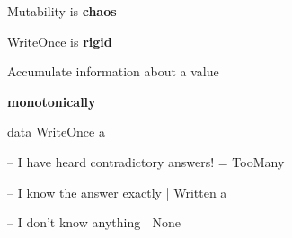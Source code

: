\documentclass[UKenglish,usenames,dvipsnames,svgnames,table,aspectratio=169,mathserif]{beamer}
\newcommand{\nl}{\vspace{\baselineskip}}
\newcommand{\pnl}{\pause \nl}
\begin{document}
\begin{frame}

\centering \LARGE

Mutability is {\bf chaos}

\nl
WriteOnce is {\bf rigid}
\end{frame}


\begin{frame}[fragile]

\LARGE
\begin{center}
Accumulate information about a value

\pnl

{\bf monotonically}
\end{center}
\end{frame}





\begin{frame}[fragile]

\begin{haskellcode}
data WriteOnce a

  -- I have heard contradictory answers!
  = TooMany

  -- I know the answer exactly
  | Written a

  -- I don't know anything
  | None
\end{haskellcode}



\end{frame}



\end{document}
